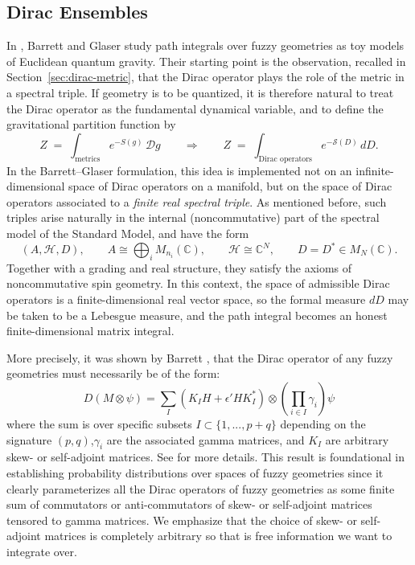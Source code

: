 \documentclass[11pt]{article}
\theoremstyle{plain}
\begin{document}
\subsection{Dirac Ensembles}
In \cite{Barrett2015},  Barrett and Glaser study path integrals over fuzzy geometries as toy models of Euclidean quantum gravity. Their starting point is the observation, recalled in Section~\ref{sec:dirac-metric}, that the Dirac operator plays the role of the metric in a spectral triple. If geometry is to be quantized, it is therefore natural to treat the Dirac operator as the fundamental dynamical variable, and to define the gravitational partition function by
\[
Z \;=\; \int_{\text{metrics}} e^{-S(g)}\, \mathcal{D}g
\qquad\Longrightarrow\qquad
Z \;=\; \int_{\text{Dirac operators}} e^{-\mathcal{S}(D)}\, dD.
\]
In the Barrett--Glaser formulation, this idea is implemented not on an infinite-dimensional space of Dirac operators on a manifold, but on the space of Dirac operators associated to a \emph{finite real spectral triple}. As mentioned before, such triples arise naturally in the internal (noncommutative) part of the spectral model of the Standard Model, and have the form
\[
(A,\mathcal{H},D), \qquad 
A \cong \bigoplus_i M_{n_i}(\mathbb{C}), \qquad
\mathcal{H}\cong \mathbb{C}^N, \qquad
D = D^\ast \in M_N(\mathbb{C}).
\]
 Together with a grading and real structure,  they  satisfy the axioms of noncommutative spin geometry. In this context, the space of admissible Dirac operators is a finite-dimensional real vector space, so the formal measure $dD$ may be taken to be a Lebesgue measure, and the path integral becomes an honest finite-dimensional matrix integral.

More precisely, it was shown by Barrett \cite{Barrett2015}, that the Dirac operator of any fuzzy geometries must necessarily be of the form:
\begin{equation*}
D(M \otimes \psi) =\sum_{I}(K_{I}H + \epsilon'H K^{*}_{I})\otimes \left(\prod_{i\in I}\gamma_{i} \right)\psi
\end{equation*}
where the sum is over specific subsets $I \subset \{1,...,p+q\}$ depending on the signature $(p,q)$,$\gamma_{i}$ are the associated gamma matrices, and $K_{I}$ are arbitrary skew- or self-adjoint matrices. See \cite{Barrett2015} for more details. This result is foundational in establishing probability distributions over spaces of fuzzy geometries since it clearly parameterizes all the Dirac operators of fuzzy geometries as some finite sum of commutators or anti-commutators of skew- or self-adjoint matrices tensored to gamma matrices. We emphasize that the choice of skew- or self-adjoint matrices is completely arbitrary so that is free information we want to integrate over. 
\end{document}
